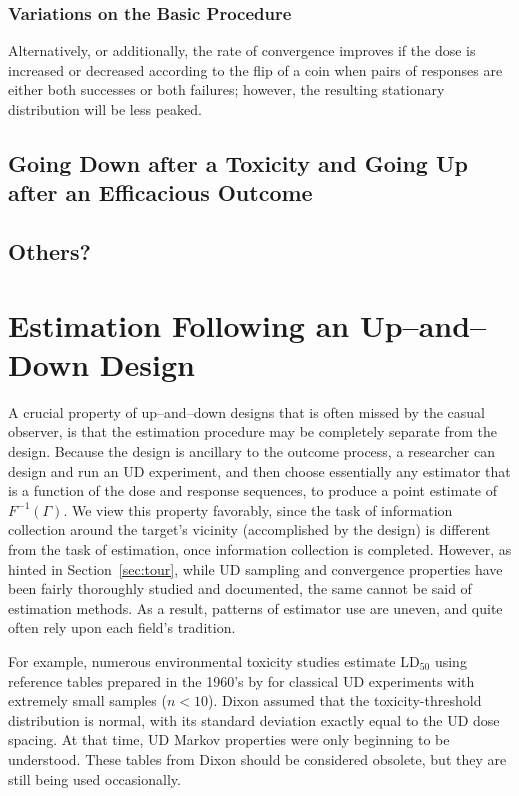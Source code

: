 \subsection{Variations on the Basic Procedure}
Alternatively, or additionally, the rate of convergence improves if the dose  is increased or decreased according to the flip of a coin when pairs of responses are either both successes or both failures; however, the resulting stationary distribution will be less peaked.

\section{Going Down after a Toxicity and Going Up after an Efficacious Outcome}
\section{Others?}

\chapter{Estimation Following an Up--and--Down Design}\label{sec:est}

A crucial property of up--and--down designs that is often missed by the casual observer, is that the estimation procedure may be completely separate from the design. Because the design is ancillary \citep{Rose:Flou:Durh:asym:1997} to the outcome process, a researcher can design and run an UD experiment, and then choose essentially any estimator that is a function of the dose and response sequences, to produce a point  estimate of $F^{-1}(\Gamma)$.  We view this property favorably, since the task of information collection around the target's vicinity (accomplished by the design) is different from the task of estimation, once information collection is completed. However, as hinted in Section~\ref{sec:tour}, while UD sampling and convergence properties have been fairly thoroughly studied and documented, the same cannot be said of estimation methods.   As a result, patterns of estimator use are uneven, and quite often rely upon each field's tradition.

For example, numerous environmental toxicity studies \citep{Lich:updo:1998,Sund:Patr:Jull:Warn:Use:2004,Sween:etal:canines:2010} estimate LD$_{50}$ using reference tables prepared in the 1960's by \cite{Dixo:up-a:1965} for classical UD experiments with extremely small samples ($n<10$). Dixon assumed that the toxicity-threshold distribution is normal, with its standard deviation exactly equal to the UD dose spacing. At that time, UD Markov properties were only beginning to be understood. These tables from Dixon should be considered obsolete, but they are still being used occasionally.

